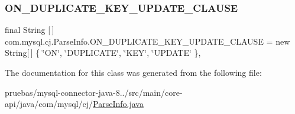 \subsubsection{\texorpdfstring{O\+N\+\_\+\+D\+U\+P\+L\+I\+C\+A\+T\+E\+\_\+\+K\+E\+Y\+\_\+\+U\+P\+D\+A\+T\+E\+\_\+\+C\+L\+A\+U\+SE}{ON\_DUPLICATE\_KEY\_UPDATE\_CLAUSE}}
{\footnotesize\ttfamily final String \mbox{[}$\,$\mbox{]} com.\+mysql.\+cj.\+Parse\+Info.\+O\+N\+\_\+\+D\+U\+P\+L\+I\+C\+A\+T\+E\+\_\+\+K\+E\+Y\+\_\+\+U\+P\+D\+A\+T\+E\+\_\+\+C\+L\+A\+U\+SE = new String\mbox{[}$\,$\mbox{]} \{ \char`\"{}ON\char`\"{}, \char`\"{}D\+U\+P\+L\+I\+C\+A\+TE\char`\"{}, \char`\"{}K\+EY\char`\"{}, \char`\"{}U\+P\+D\+A\+TE\char`\"{} \}\hspace{0.3cm}{\ttfamily [static]}, {\ttfamily [protected]}}



The documentation for this class was generated from the following file\+:\begin{DoxyCompactItemize}
\item 
pruebas/mysql-\/connector-\/java-\/8../src/main/core-\/api/java/com/mysql/cj/\mbox{\hyperlink{_parse_info_8java}{Parse\+Info.\+java}}\end{DoxyCompactItemize}
